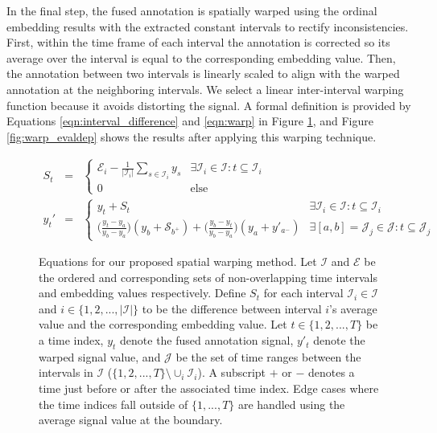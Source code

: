 \documentclass[times,twocolumn,final,authoryear]{elsarticle}
\begin{document}
In the final step, the fused annotation is spatially warped using the ordinal embedding results with the extracted constant intervals to rectify inconsistencies.  First, within the time frame of each interval the annotation is corrected so its average over the interval is equal to the corresponding embedding value.  Then, the annotation between two intervals is linearly scaled to align with the warped annotation at the neighboring intervals.  We select a linear inter-interval warping function because it avoids distorting the signal.  A formal definition is provided by Equations \ref{eqn:interval_difference} and \ref{eqn:warp} in Figure \ref{fig:equations}, and Figure \ref{fig:warp_evaldep} shows the results after applying this warping technique.

\begin{figure}[!t]
\normalsize
\setcounter{equation}{0}
\begin{eqnarray}
\label{eqn:interval_difference}
S_t &=& 
\begin{cases}
\mathcal{E}_i - \frac{1}{|\mathcal{I}_i|}\sum\limits_{s \in \mathcal{I}_i} y_{s} & \exists \mathcal{I}_i \in \mathcal{I} : t \subseteq \mathcal{I}_i \\
0 & \text{else}
\end{cases} \\
\label{eqn:warp}
y_t' &=& 
\begin{cases}
y_t + S_t & \exists \mathcal{I}_i \in \mathcal{I} : t \subseteq \mathcal{I}_i \\
\Big(\frac{y_t-y_a}{y_b-y_a}\Big)(y_b + \mathcal{S}_{b^+}) + \Big(\frac{y_b-y_t}{y_b-y_a}\Big)(y_a + y'_{a^-}) & \exists [a,b] = \mathcal{J}_j \in \mathcal{J} : t \subseteq \mathcal{J}_j
\end{cases}
\end{eqnarray}
\hrulefill
\vspace*{4pt}
\caption{Equations for our proposed spatial warping method. Let $\mathcal{I}$ and $\mathcal{E}$ be the ordered and corresponding sets of non-overlapping time intervals and embedding values respectively.  Define $S_t$ for each interval $\mathcal{I}_i \in \mathcal{I}$ and $i \in \{1,2,...,|\mathcal{I}|\}$ to be the difference between interval $i$'s average value and the corresponding embedding value.  Let $t \in \{1,2,...,T\}$ be a time index, $y_t$ denote the fused annotation signal, $y'_t$ denote the warped signal value, and $\mathcal{J}$ be the set of time ranges between the intervals in $\mathcal{I}$ ($\{1,2,...,T\} \setminus \cup_{i} \mathcal{I}_i$).  A subscript $+$ or $-$ denotes a time just before or after the associated time index.  Edge cases where the time indices fall outside of $\{1,...,T\}$ are handled using the average signal value at the boundary.}
\label{fig:equations}
\end{figure}
\end{document}
